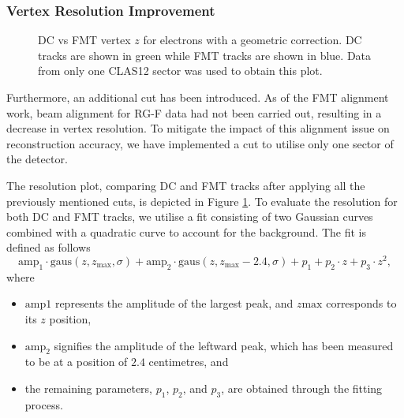 \subsubsection{Vertex Resolution Improvement}
\label{12.43::vertex_resolution_improvement}

    \begin{figure}[b!]
        \caption[DC vs FMT $z$ with geometry correction]
        {DC vs FMT vertex $z$ for electrons with a geometric correction.
        DC tracks are shown in green while FMT tracks are shown in blue.
        Data from only one CLAS12 sector was used to obtain this plot.}
        \label{fig::12.43::dc_vs_fmt_vz_11983_corrected}
    \end{figure}

    Furthermore, an additional cut has been introduced.
    As of the FMT alignment work, beam alignment for RG-F data had not been carried out, resulting in a decrease in vertex resolution.
    To mitigate the impact of this alignment issue on reconstruction accuracy, we have implemented a cut to utilise only one sector of the detector.

    The resolution plot, comparing DC and FMT tracks after applying all the previously mentioned cuts, is depicted in Figure \ref{fig::12.43::dc_vs_fmt_vz_11983_corrected}.
    To evaluate the resolution for both DC and FMT tracks, we utilise a fit consisting of two Gaussian curves combined with a quadratic curve to account for the background.
    The fit is defined as follows
    \begin{equation*}
        \text{amp}_1 \cdot \text{gaus}(z, z_\text{max}, \sigma) + \text{amp}_2 \cdot \text{gaus}(z, z_\text{max} - 2.4, \sigma) + p_1 + p_2\cdot z + p_3\cdot z^2,
    \end{equation*}
    where
    \begin{itemize}
        \item
            $\text{amp}1$ represents the amplitude of the largest peak, and $z\text{max}$ corresponds to its $z$ position,
        \item
            $\text{amp}_2$ signifies the amplitude of the leftward peak, which has been measured to be at a position of $2.4$ centimetres, and
        \item
            the remaining parameters, $p_1$, $p_2$, and $p_3$, are obtained through the fitting process.
    \end{itemize}

